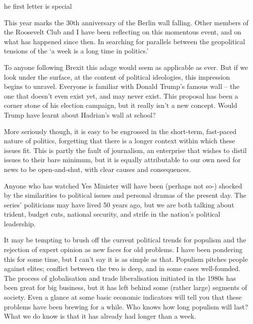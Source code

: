 \label{ch:one-week-in-politics}

he first letter is special



   This year marks the 30th anniversary of the Berlin wall falling. Other
   members of the Roosevelt Club and I have been reflecting on this
   momentous event, and on what has happened since then. In searching for
   parallels between the geopolitical tensions of the `a week is a long
   time in politics.'

   To anyone following Brexit this adage would seem as applicable as ever.
   But if we look under the surface, at the content of political
   ideologies, this impression begins to unravel. Everyone is familiar
   with Donald Trump's famous wall -- the one that doesn't even exist yet,
   and may never exist. This proposal has been a corner stone of his
   election campaign, but it really isn't a new concept. Would Trump have
   learnt about Hadrian's wall at school?

   More seriously though, it is easy to be engrossed in the short-term,
   fast-paced nature of politics, forgetting that there is a longer
   context within which these issues fit. This is partly the fault of
   journalism, an enterprise that wishes to distil issues to their bare
   minimum, but it is equally attributable to our own need for news to be
   open-and-shut, with clear causes and consequences.

   Anyone who has watched Yes Minister will have been (perhaps not so-)
   shocked by the similarities to political issues and personal dramas of
   the present day. The series' politicians may have lived 50 years ago,
   but we are both talking about trident, budget cuts, national security,
   and strife in the nation's political leadership.

   It may be tempting to brush off the current political trends for
   populism and the rejection of expert opinion as new faces for old
   problems. I have been pondering this for some time, but I can't say it
   is as simple as that. Populism pitches people against elites; conflict
   between the two is deep, and in some cases well-founded. The process of
   globalisation and trade liberalisation initiated in the 1980s has been
   great for big business, but it has left behind some (rather large)
   segments of society. Even a glance at some basic economic indicators
   will tell you that these problems have been brewing for a while. Who
   knows how long populism will last? What we do know is that it has
   already had longer than a week.

